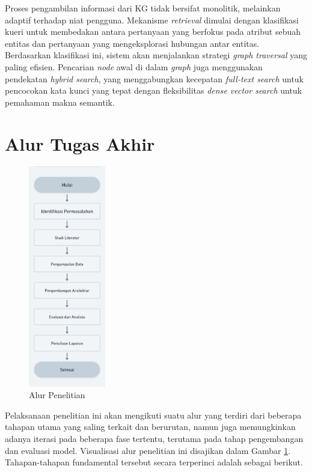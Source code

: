 Proses pengambilan informasi dari KG tidak bersifat monolitik, melainkan adaptif terhadap niat pengguna.
Mekanisme \textit{retrieval} dimulai dengan klasifikasi kueri untuk membedakan antara pertanyaan yang berfokus pada atribut sebuah entitas dan pertanyaan yang mengeksplorasi hubungan antar entitas.
Berdasarkan klasifikasi ini, sistem akan menjalankan strategi \textit{graph traversal} yang paling efisien.
Pencarian \textit{node} awal di dalam \textit{graph} juga menggunakan pendekatan \textit{hybrid search}, yang menggabungkan kecepatan \textit{full-text search} untuk pencocokan kata kunci yang tepat dengan fleksibilitas \textit{dense vector search} untuk pemahaman makna semantik.

\section{Alur Tugas Akhir}
\begin{figure}[h]
	\centering
	\includegraphics[width=0.3\textwidth]{images/alur-penelitian.png}
	\caption{
		Alur Penelitian
	}
	\label{fig:research-flow}
\end{figure}

Pelaksanaan penelitian ini akan mengikuti suatu alur yang terdiri dari beberapa tahapan utama yang saling terkait dan berurutan,
namun juga memungkinkan adanya iterasi pada beberapa fase tertentu, terutama pada tahap pengembangan dan evaluasi model.
Visualisasi alur penelitian ini disajikan dalam Gambar \ref{fig:research-flow}.
Tahapan-tahapan fundamental tersebut secara terperinci adalah sebagai berikut.


